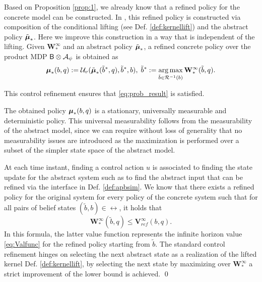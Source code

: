 \documentclass{ifacconf}
\newcommand{\new}[1]{{\color{blue}#1}}
\begin{document}
Based on Proposition \ref{prop:1}, we already know that a refined policy for the concrete model can be constructed. In \cite{haesaert2017verification}, this refined policy is constructed via composition of the conditional lifting %
 (see Def. \ref{def:kernellift}) and the abstract policy $\tilde  {{\boldsymbol{\mu}}}_\ast$. Here we improve this construction in a way that is independent of the lifting. Given $\mathbf{W}^\infty_\ast$ and an abstract policy $\tilde {{\boldsymbol{\mu}}}_\ast$, a refined concrete policy over the product MDP $\mathsf{B}\otimes\mathcal{A}_\psi$ is obtained as
\begin{equation*}
		{\boldsymbol{\mu}}_\ast(b,q): = \mathcal{U}_{v}( \tilde{{\boldsymbol{\mu}}}_\ast(\tilde b^*, q), \tilde b^*, b), \; \tilde b^*:=\operatorname*{arg\,max}_{ \tilde b\in
		\mathcal{R}^{-1}(b)} \mathbf  W^\infty_\ast(\tilde b,q).
\end{equation*}
\begin{prop}
  This control refinement ensures that \eqref{eq:prob_result} is satisfied.
\end{prop}
The obtained policy $	{\boldsymbol{\mu}}_\ast(b,q)$ is a stationary, universally measurable and deterministic policy. This universal measurability follows from the measurability of the abstract model, since we can require without loss of generality that no measurability  issues are introduced as the maximization is performed over a subset of the simpler state space of the abstract model. 
\begin{pf}\new{At each time instant, finding a control action $u$ is associated to finding the state update for the abstract system such as to find the abstract input that can be refined via the interface in Def. \ref{def:apbsim}.  
We know that there exists a refined policy for the original system for every policy of the concrete system such that 
for all pairs of belief states $(\tilde b,b)\in\rel$, it holds that 
\begin{equation}\label{eq:W:V}\mathbf  W^\infty_\ast(\tilde b,q)\leq \mathbf  V^\infty_{ref}( b,q).\end{equation} In this formula, the latter value function represents the infinite horizon value \eqref{eq:Valfunc} for the refined policy starting from $\tilde b$.   The standard control refinement hinges on selecting the next abstract state as a realization of the lifted kernel Def. \ref{def:kernellift}, by selecting the next state by maximizing over $\mathbf  W^\infty_\ast$ a strict improvement of the lower bound is achieved.  }\qed
\end{pf}
\end{document}
